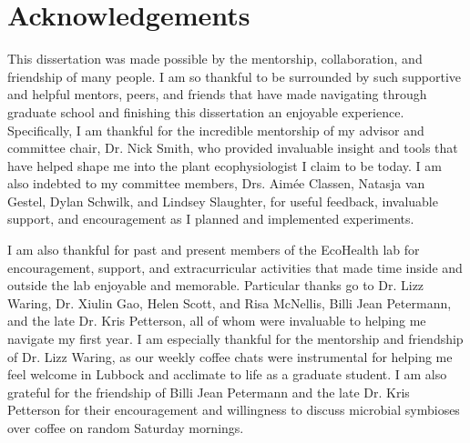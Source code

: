 \documentclass{ttuthes2007}
\begin{document}

\frontmatter

\chapter{\textbf{Acknowledgements}}
This dissertation was made possible by the mentorship, collaboration, and friendship of many people. I am so thankful to be surrounded by such supportive and helpful mentors, peers, and friends that have made navigating through graduate school and finishing this dissertation an enjoyable experience. Specifically, I am thankful for the incredible mentorship of my advisor and committee chair, Dr. Nick Smith, who provided invaluable insight and tools that have helped shape me into the plant ecophysiologist I claim to be today. I am also indebted to my committee members, Drs. Aimée Classen, Natasja van Gestel, Dylan Schwilk, and Lindsey Slaughter, for useful feedback, invaluable support, and encouragement as I planned and implemented experiments.

I am also thankful for past and present members of the EcoHealth lab for encouragement, support, and extracurricular activities that made time inside and outside the lab enjoyable and memorable. Particular thanks go to Dr. Lizz Waring, Dr. Xiulin Gao, Helen Scott, and Risa McNellis, Billi Jean Petermann, and the late Dr. Kris Petterson, all of whom were invaluable to helping me navigate my first year. I am especially thankful for the mentorship and friendship of Dr. Lizz Waring, as our weekly coffee chats were instrumental for helping me feel welcome in Lubbock and acclimate to life as a graduate student. I am also grateful for the friendship of Billi Jean Petermann and the late Dr. Kris Petterson for their encouragement and willingness to discuss microbial symbioses over coffee on random Saturday mornings.
\end{document}
